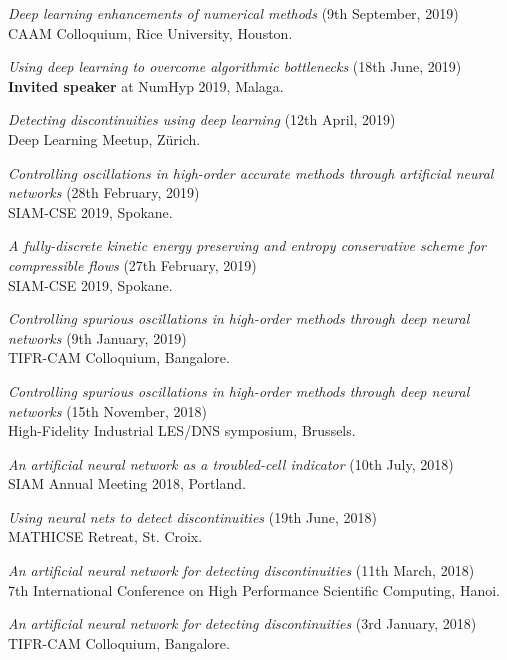 \documentclass[margin]{res}
\begin{document}
\begin{resume}
               {\it Deep learning enhancements of numerical methods} (9th September, 2019)\\
              CAAM Colloquium, Rice University, Houston.
              
              {\it Using deep learning to overcome algorithmic bottlenecks} (18th June, 2019)\\
              \textbf{Invited speaker} at NumHyp 2019, Malaga.
              
              {\it Detecting discontinuities using deep learning} (12th April, 2019)\\
              Deep Learning Meetup, Z\"{u}rich.
                         
             {\it Controlling oscillations in high-order accurate methods through artificial neural networks} (28th February, 2019)\\
              SIAM-CSE 2019, Spokane.
              
              {\it A fully-discrete kinetic energy preserving and entropy conservative scheme for compressible flows} (27th February, 2019)\\
              SIAM-CSE 2019, Spokane.
              
              {\it Controlling spurious oscillations in high-order methods through deep neural networks} (9th January, 2019)\\
              TIFR-CAM Colloquium, Bangalore.
              
               {\it Controlling spurious oscillations in high-order methods through deep neural networks} (15th November, 2018)\\
              High-Fidelity Industrial LES/DNS symposium, Brussels.
             
              {\it An artificial neural network as a troubled-cell indicator} (10th July, 2018)\\
              SIAM Annual Meeting 2018, Portland.
              
               {\it Using neural nets to detect discontinuities} (19th June, 2018)\\
              MATHICSE Retreat, St. Croix.
              
              {\it An artificial neural network for detecting discontinuities} (11th March, 2018)\\
              7th International Conference on High Performance Scientific Computing, Hanoi. 
              
              {\it An artificial neural network for detecting discontinuities} (3rd January, 2018)\\
              TIFR-CAM Colloquium, Bangalore.
              

\end{resume}
\end{document}

